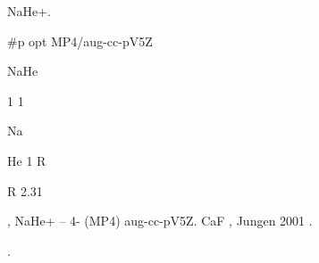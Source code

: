 \documentclass[a4paper]{article}
\begin{document}
{\CYRP}{\cyrr}{\cyri}{\cyrm}{\cyre}{\cyrr} {\cyrk}{\cyro}{\cyrd}{\cyra}
{\cyrp}{\cyrr}{\cyro}{\cyrg}{\cyrr}{\cyra}{\cyrm}{\cyrm}{\cyrery} {\cyrd}{\cyrl}{\cyrya}
{\cyrr}{\cyra}{\cyrs}{\cyrch}{\cyre}{\cyrt}{\cyra}
{\cyro}{\cyrp}{\cyrt}{\cyri}{\cyrm}{\cyra}{\cyrl}{\cyrsftsn}{\cyrn}{\cyro}{\cyrishrt}
{\cyrk}{\cyro}{\cyrn}{\cyrf}{\cyri}{\cyrg}{\cyru}{\cyrr}{\cyra}{\cyrc}{\cyri}{\cyri} {\cyri}{\cyro}{\cyrn}{\cyra}
\foreignlanguage{english}{NaHe}+.

\foreignlanguage{english}{\#p opt MP4/aug-cc-pV5Z}

\foreignlanguage{english}{NaHe}

\foreignlanguage{english}{1 1}

\foreignlanguage{english}{Na \ \ \ \ \ \ \ \ \ \ \ \ }

\foreignlanguage{english}{He 1 R}

\foreignlanguage{english}{R 2.31}

{\CYRV}{\cyri}{\cyrd}{\cyrn}{\cyro}, {\cyrch}{\cyrt}{\cyro}
{\cyrp}{\cyrr}{\cyro}{\cyri}{\cyrz}{\cyrv}{\cyro}{\cyrd}{\cyri}{\cyrt}{\cyrs}{\cyrya}
{\cyro}{\cyrp}{\cyrt}{\cyri}{\cyrm}{\cyri}{\cyrz}{\cyra}{\cyrc}{\cyri}{\cyrya}
{\cyrm}{\cyre}{\cyrzh}{\cyrhrdsn}{\cyrya}{\cyrd}{\cyre}{\cyrr}{\cyrn}{\cyro}{\cyrg}{\cyro}
{\cyrr}{\cyra}{\cyrs}{\cyrs}{\cyrt}{\cyro}{\cyrya}{\cyrn}{\cyri}{\cyrya} {\cyrv} {\cyri}{\cyro}{\cyrn}{\cyre}
\foreignlanguage{english}{NaHe}+ {\cyrm}{\cyre}{\cyrt}{\cyro}{\cyrd}{\cyro}{\cyrm}
{\CYRM}{\cyro}{\cyrl}{\cyrsftsn}{\cyre}{\cyrr}{\cyra}--{\CYRP}{\cyrl}{\cyri}{\cyrs}{\cyrs}{\cyre} 4-{\cyrg}{\cyro}
{\cyrp}{\cyro}{\cyrr}{\cyrya}{\cyrd}{\cyrk}{\cyra} (\foreignlanguage{english}{MP}4) {\cyrs}
{\cyri}{\cyrs}{\cyrp}{\cyro}{\cyrl}{\cyrsftsn}{\cyrz}{\cyru}{\cyre}{\cyrm}{\cyrery}{\cyrm}
{\cyrb}{\cyra}{\cyrz}{\cyri}{\cyrs}{\cyro}{\cyrm} aug-cc-pV5Z. {\CYRD}{\cyrl}{\cyrya}
{\cyrm}{\cyro}{\cyrl}{\cyre}{\cyrk}{\cyru}{\cyrl}{\cyrery} \foreignlanguage{english}{CaF}
{\cyrb}{\cyrery}{\cyrl}{\cyri}
{\cyri}{\cyrs}{\cyrp}{\cyro}{\cyrl}{\cyrsftsn}{\cyrz}{\cyro}{\cyrv}{\cyra}{\cyrn}{\cyrery}
{\cyrerev}{\cyrk}{\cyrs}{\cyrp}{\cyre}{\cyrr}{\cyri}{\cyrm}{\cyre}{\cyrn}{\cyrt}{\cyra}{\cyrl}{\cyrsftsn}{\cyrn}{\cyrery}{\cyre}
{\cyrr}{\cyre}{\cyrz}{\cyru}{\cyrl}{\cyrsftsn}{\cyrt}{\cyra}{\cyrt}{\cyrery},
{\cyrp}{\cyro}{\cyrl}{\cyru}{\cyrch}{\cyre}{\cyrn}{\cyrn}{\cyrery}{\cyre} \foreignlanguage{english}{Jungen} {\cyrv}
2001 {\cyrg}{\cyro}{\cyrd}{\cyru}.

{\CYRP}{\cyrr}{\cyri}{\cyrv}{\cyre}{\cyrd}{\cyre}{\cyrm} {\cyrd}{\cyrl}{\cyrya}
{\cyrk}{\cyra}{\cyrzh}{\cyrd}{\cyro}{\cyrg}{\cyro} {\cyri}{\cyro}{\cyrn}{\cyra}
{\cyrs}{\cyrv}{\cyro}{\cyrd}{\cyrn}{\cyru}{\cyryu} {\cyrt}{\cyra}{\cyrb}{\cyrl}{\cyri}{\cyrc}{\cyru}
{\cyrp}{\cyro}{\cyrl}{\cyru}{\cyrch}{\cyre}{\cyrn}{\cyrn}{\cyrery}{\cyrh}
{\cyrr}{\cyre}{\cyrz}{\cyru}{\cyrl}{\cyrsftsn}{\cyrt}{\cyra}{\cyrt}{\cyro}{\cyrv}.
\end{document}
